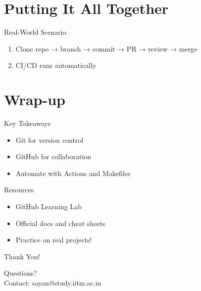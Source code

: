 \documentclass[aspectratio=169]{beamer} %
\begin{document}
\section{Putting It All Together}

\begin{frame}{Real-World Scenario}
  \begin{enumerate}
    \item Clone repo → branch → commit → PR → review → merge
    \item CI/CD runs automatically
  \end{enumerate}
\end{frame}

\section{Wrap-up}

\begin{frame}{Key Takeaways}
  \begin{itemize}
    \item Git for version control
    \item GitHub for collaboration
    \item Automate with Actions and Makefiles
  \end{itemize}
\end{frame}

\begin{frame}{Resources}
  \begin{itemize}
    \item GitHub Learning Lab
    \item Official docs and cheat sheets
    \item Practice on real projects!
  \end{itemize}
\end{frame}

\begin{frame}{Thank You!}
  \begin{center}
    Questions? \\
    Contact: sayan@study.iitm.ac.in
  \end{center}
\end{frame}
\end{document}
